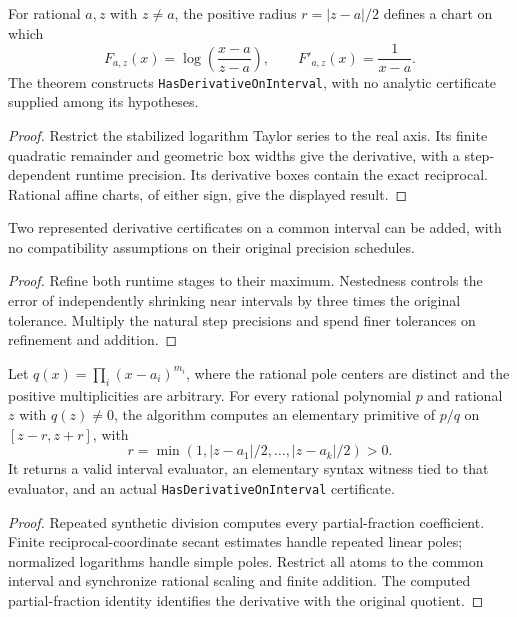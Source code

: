 \begin{theorem}
\label{thm:rational-logarithm-primitive-analytic}
\leanok
For rational \(a,z\) with \(z\ne a\), the positive radius
\(r=|z-a|/2\) defines a chart on which
\[
 F_{a,z}(x)=\log\left(\frac{x-a}{z-a}\right),\qquad
 F'_{a,z}(x)=\frac1{x-a}.
\]
The theorem constructs \texttt{HasDerivativeOnInterval}, with no analytic
certificate supplied among its hypotheses.
\end{theorem}
\begin{proof}\leanok
Restrict the stabilized logarithm Taylor series to the real axis. Its finite
quadratic remainder and geometric box widths give the derivative, with a
step-dependent runtime precision. Its derivative boxes contain the exact
reciprocal. Rational affine charts, of either sign, give the displayed result.
\end{proof}

\begin{theorem}
\label{thm:rational-primitive-sum-analytic}
\leanok
Two represented derivative certificates on a common interval can be added,
with no compatibility assumptions on their original precision schedules.
\end{theorem}
\begin{proof}\leanok
Refine both runtime stages to their maximum. Nestedness controls the error
of independently shrinking near intervals by three times the original
tolerance. Multiply the natural step precisions and spend finer tolerances
on refinement and addition.
\end{proof}

\begin{theorem}
\label{thm:rational-split-primitive-analytic}
\leanok
Let \(q(x)=\prod_i(x-a_i)^{m_i}\), where the rational pole centers are distinct
and the positive multiplicities are arbitrary. For every rational polynomial
\(p\) and rational \(z\) with \(q(z)\ne0\), the algorithm computes an elementary
primitive of \(p/q\) on \([z-r,z+r]\), with
\[
 r=\min(1,|z-a_1|/2,\ldots,|z-a_k|/2)>0.
\]
It returns a valid interval evaluator, an elementary syntax witness tied to
that evaluator, and an actual \texttt{HasDerivativeOnInterval} certificate.
\end{theorem}
\begin{proof}\leanok
Repeated synthetic division computes every partial-fraction coefficient.
Finite reciprocal-coordinate secant estimates handle repeated linear poles;
normalized logarithms handle simple poles. Restrict all atoms to the common
interval and synchronize rational scaling and finite addition. The computed
partial-fraction identity identifies the derivative with the original quotient.
\end{proof}


